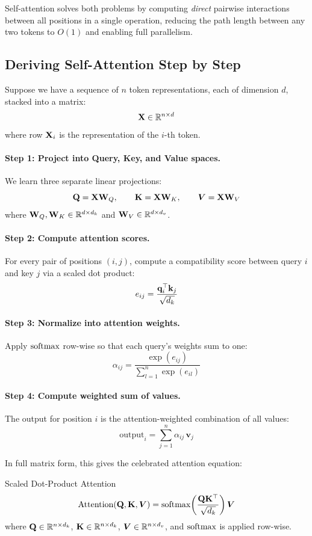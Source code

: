 Self-attention solves both problems by computing \emph{direct} pairwise
interactions between all positions in a single operation, reducing the path
length between any two tokens to $O(1)$ and enabling full parallelism.

\subsection{Deriving Self-Attention Step by Step}

Suppose we have a sequence of $n$ token representations, each of dimension $d$,
stacked into a matrix:
\[
    \mathbf{X} \in \mathbb{R}^{n \times d}
\]
where row $\mathbf{X}_i$ is the representation of the $i$-th token.

\paragraph{Step 1: Project into Query, Key, and Value spaces.}
We learn three separate linear projections:
\[
    \mathbf{Q} = \mathbf{X} \mathbf{W}_Q, \qquad
    \mathbf{K} = \mathbf{X} \mathbf{W}_K, \qquad
    \bm{V} = \mathbf{X} \mathbf{W}_V
\]
where $\mathbf{W}_Q, \mathbf{W}_K \in \mathbb{R}^{d \times d_k}$ and $\mathbf{W}_V \in \mathbb{R}^{d \times d_v}$.

\paragraph{Step 2: Compute attention scores.}
For every pair of positions $(i,j)$, compute a compatibility score between
query $i$ and key $j$ via a scaled dot product:
\[
    e_{ij} = \frac{\mathbf{q}_i^\top \mathbf{k}_j}{\sqrt{d_k}}
\]

\paragraph{Step 3: Normalize into attention weights.}
Apply $\operatorname{softmax}$ row-wise so that each query's weights sum to one:
\[
    \alpha_{ij} = \frac{\exp(e_{ij})}{\sum_{l=1}^{n} \exp(e_{il})}
\]

\paragraph{Step 4: Compute weighted sum of values.}
The output for position $i$ is the attention-weighted combination of all values:
\[
    \text{output}_i = \sum_{j=1}^{n} \alpha_{ij}\, \mathbf{v}_j
\]

In full matrix form, this gives the celebrated attention equation:

\begin{mathresult}{Scaled Dot-Product Attention}
\[
    \text{Attention}(\mathbf{Q}, \mathbf{K}, \bm{V})
    = \operatorname{softmax}\!\left(\frac{\mathbf{Q} \mathbf{K}^\top}{\sqrt{d_k}}\right) \bm{V}
\]
where $\mathbf{Q} \in \mathbb{R}^{n \times d_k}$, $\mathbf{K} \in \mathbb{R}^{n \times d_k}$,
$\bm{V} \in \mathbb{R}^{n \times d_v}$, and $\operatorname{softmax}$ is applied row-wise.
\end{mathresult}

